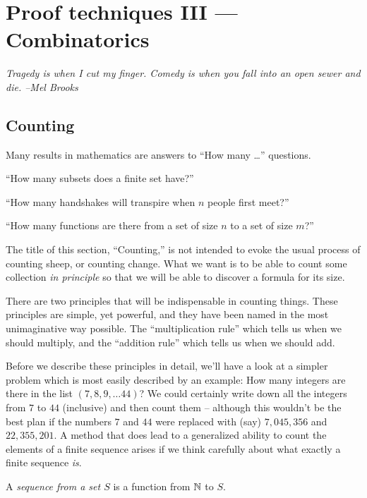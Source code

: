 
\chapter{Proof techniques III --- Combinatorics}
\label{ch:comb}

{\em Tragedy is when I cut my finger. Comedy is when you fall into an open sewer and die. --Mel Brooks }

\section{Counting}
\label{sec:counting}

Many results in mathematics are answers to ``How many \ldots'' questions.

\noindent ``How many subsets does a finite set have?''

\noindent ``How many handshakes will transpire when $n$ people first meet?''

\noindent ``How many functions are there from a set of size $n$ to a set of size $m$?''

The title of this section, ``Counting,'' is not intended to evoke the usual
process of counting sheep, or counting change.  What we want is to be able
to count some collection \emph{in principle} so that we will be able to 
discover a formula for its size.

There are two principles that will be indispensable in counting things.
These principles are simple, yet powerful, and they have been named in
the most unimaginative way possible.  The ``multiplication rule'' which
tells us when we should multiply, and the ``addition rule'' which tells
us when we should add.  

Before we describe these principles in detail,
we'll have a look at a simpler problem which is most easily described
by an example: How many integers are there in the list $(7,8,9,\ldots 44)$?
We could certainly write down all the integers from $7$ to $44$ (inclusive) 
and then count them -- although this wouldn't be the best plan if the numbers
$7$ and $44$ were replaced with (say) $7,045,356$ and $22,355,201$.  A method
that does lead to a generalized ability to count the elements of a finite
sequence arises if we think carefully about what exactly a finite sequence 
\emph{is}.  

\begin{defi}
A \emph{sequence from a set $S$} is a function from 
${\mathbb N}$ to $S$.
\end{defi}

